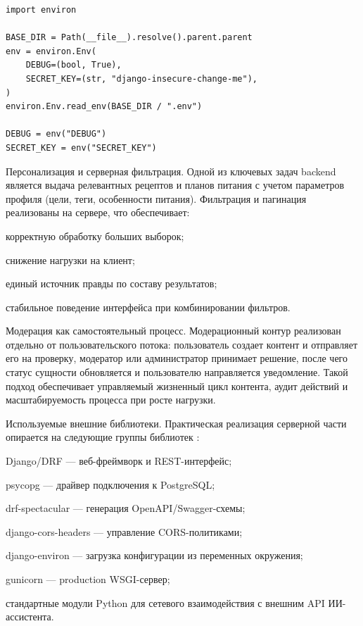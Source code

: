 \begin{listing}[H]
\caption{Загрузка переменных окружения в настройках backend}
\label{listing:env-loading}
\begin{mdframed}
\begin{verbatim}
import environ

BASE_DIR = Path(__file__).resolve().parent.parent
env = environ.Env(
    DEBUG=(bool, True),
    SECRET_KEY=(str, "django-insecure-change-me"),
)
environ.Env.read_env(BASE_DIR / ".env")

DEBUG = env("DEBUG")
SECRET_KEY = env("SECRET_KEY")
\end{verbatim}
\end{mdframed}
\end{listing}

Персонализация и серверная фильтрация. Одной из ключевых задач backend является выдача релевантных рецептов и планов питания с учетом параметров профиля (цели, теги, особенности питания). Фильтрация и пагинация реализованы на сервере, что обеспечивает:
\begin{compactlist}
  \item корректную обработку больших выборок;
  \item снижение нагрузки на клиент;
  \item единый источник правды по составу результатов;
  \item стабильное поведение интерфейса при комбинировании фильтров.
\end{compactlist}

Модерация как самостоятельный процесс. Модерационный контур реализован отдельно от пользовательского потока: пользователь создает контент и отправляет его на проверку, модератор или администратор принимает решение, после чего статус сущности обновляется и пользователю направляется уведомление. Такой подход обеспечивает управляемый жизненный цикл контента, аудит действий и масштабируемость процесса при росте нагрузки.

Используемые внешние библиотеки. Практическая реализация серверной части опирается на следующие группы библиотек \cite{django_docs_2026,drf_docs_2026,psycopg_docs_2026,drf_spectacular_docs_2026,django_cors_headers_docs_2026,django_environ_docs_2026,gunicorn_docs_2026}:
\begin{compactlist}
  \item Django/DRF --- веб-фреймворк и REST-интерфейс;
  \item psycopg --- драйвер подключения к PostgreSQL;
  \item drf-spectacular --- генерация OpenAPI/Swagger-схемы;
  \item django-cors-headers --- управление CORS-политиками;
  \item django-environ --- загрузка конфигурации из переменных окружения;
  \item gunicorn --- production WSGI-сервер;
  \item стандартные модули Python для сетевого взаимодействия с внешним API ИИ-ассистента.
\end{compactlist}

